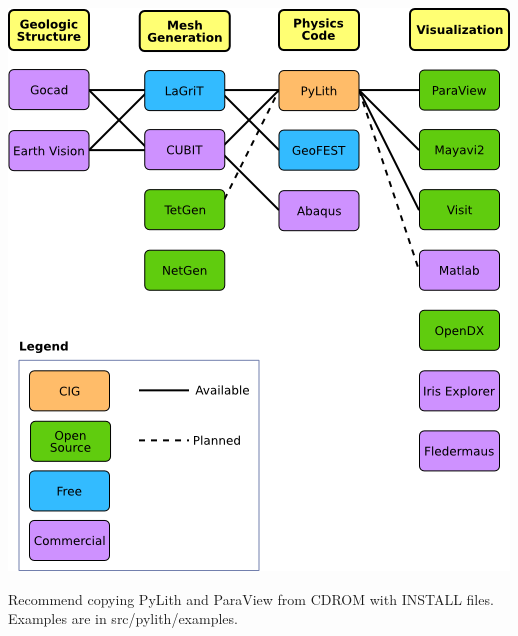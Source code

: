 \documentclass[pdftex,cig,slideColor]{pp4slides}
\begin{document}

  \vfill
  \begin{center}
    \includegraphics[scale=0.9]{figs/workflow}
  \end{center}


  \vfill
  Recommend copying PyLith and ParaView from CDROM with INSTALL files.
  \vfill
  Examples are in src/pylith/examples.
  \vfill

\end{document}
